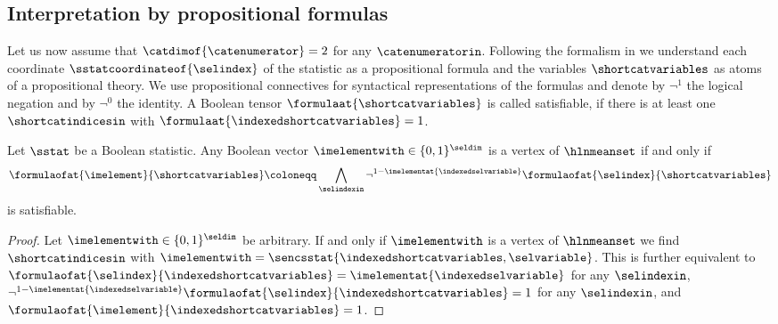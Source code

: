 \subsection{Interpretation by propositional formulas}

Let us now assume that $\catdimof{\catenumerator}=2$ for any $\catenumeratorin$.
Following the formalism in \cite{goessmann_tensor_2026} we understand each coordinate $\sstatcoordinateof{\selindex}$ of the statistic as a propositional formula and the variables $\shortcatvariables$ as atoms of a propositional theory.
We use propositional connectives for syntactical representations of the formulas and denote by $\lnot^{1}$ the logical negation and by $\lnot^{0}$ the identity.
A Boolean tensor $\formulaat{\shortcatvariables}$ is called satisfiable, if there is at least one $\shortcatindicesin$ with $\formulaat{\indexedshortcatvariables}=1$.

\begin{theorem}\label{the:boolVecSat}
    Let $\sstat$ be a Boolean statistic.
    Any Boolean vector $\imelementwith\in\{0,1\}^{\seldim}$ is a vertex of $\hlnmeanset$ if and only if
    \begin{align*}
        \formulaofat{\imelement}{\shortcatvariables}
        \coloneqq \bigwedge_{\selindexin} \lnot^{1-\imelementat{\indexedselvariable}} \formulaofat{\selindex}{\shortcatvariables}
    \end{align*}
    is satisfiable.
\end{theorem}
\begin{proof}
    Let $\imelementwith\in\{0,1\}^{\seldim}$ be arbitrary.
    If and only if $\imelementwith$ is a vertex of $\hlnmeanset$ we find $\shortcatindicesin$ with $\imelementwith=\sencsstat{\indexedshortcatvariables,\selvariable}$.
    This is further equivalent to $\formulaofat{\selindex}{\indexedshortcatvariables}=\imelementat{\indexedselvariable}$ for any $\selindexin$, $\lnot^{1-\imelementat{\indexedselvariable}}\formulaofat{\selindex}{\indexedshortcatvariables}=1$ for any $\selindexin$, and $\formulaofat{\imelement}{\indexedshortcatvariables}=1$.
\end{proof}

